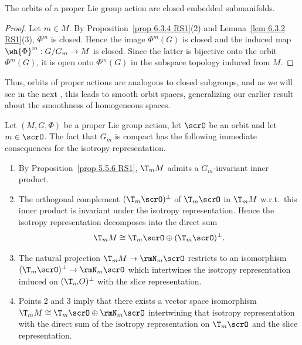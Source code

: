 \begin{cor}
    The orbits of a proper Lie group action are closed embedded submanifolds.
\end{cor}
\begin{proof}
    Let $m\in M$. By Proposition~\ref{prop 6.3.4 RS1}(2) and Lemma~\ref{lem 6.3.2 RS1}(3), $\Phi^m$ is closed. Hence the image $\Phi^m(G)$ is closed and the induced map  $\wh{\Phi}^m:G\slash G_m\to M$ is closed. Since the latter is bijective onto the orbit $\Phi^m(G)$, it is open onto $\Phi^m(G)$ in the subspace topology induced from $M$.
\end{proof}

Thus, orbits of proper actions are analogous to closed subgroups, and as we will see in the next \sect, this leads to smooth orbit spaces, generalizing our earlier result about the smoothness of homogeneous spaces.

\begin{rem}\label{rem 6.3.6 RS1}
    Let $(M,G,\Phi)$ be a proper Lie group action, let $\scrO$ be an orbit and let $m\in \scrO$. The fact that $G_m$ is compact has the following immediate consequences for the isotropy representation.
    \begin{enumerate}
        \item By Proposition~\ref{prop 5.5.6 RS1}, $\T_mM$ admits a $G_m$-invariant inner product.
        \item The orthogonal complement $(\T_m\scrO)^\perp$ of $\T_m\scrO$  in $\T_mM$ w.r.t.\ this inner product is invariant under the isotropy representation. Hence the isotropy representation decomposes into the direct sum
        \[\T_mM\cong \T_m\scrO\oplus (\T_m\scrO)^\perp.\]
        \item The natural projection $\T_mM\to \rmN_m\scrO$ restricts to an isomorphism $(\T_m\scrO)^\perp\to \rmN_m\scrO$ which intertwines the isotropy representation induced on $(\T_mO)^\perp$ with the slice representation.
        \item Points 2 and 3 imply that there exists a vector space isomorphism $\T_mM\cong \T_m\scrO\oplus \rmN_m\scrO$ intertwining that isotropy representation with the direct sum of the isotropy representation on $\T_m\scrO$ and the slice representation.
    \end{enumerate}
\end{rem}


